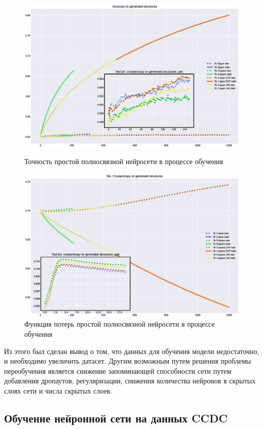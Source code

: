\documentclass{article}
\begin{document}
\begin{figure}[!h]
\includegraphics[width=\linewidth]{imgs/acc-7k.eps}
  \caption{Точность простой полносвязной нейросети в процессе обучения}\label{fig:acc_7k}
\endminipage\hfill
{}%
\includegraphics[width=\linewidth]{imgs/loss-7k.eps}
  \caption{Функция потерь простой полносвязной нейросети в процессе обучения}\label{fig:loss_7k}
\endminipage
\end{figure}

Из этого был сделан вывод о том, что данных для обучения модели недостаточно, и необходимо увеличить датасет. Другим возможным путем решения проблемы переобучения является снижение запоминающей способности сети путем добавления дропаутов, регуляризации, снижения количества нейронов в скрытых слоях сети и числа скрытых слоев.

\subsection{Обучение нейронной сети на данных CCDC}
\end{document}

